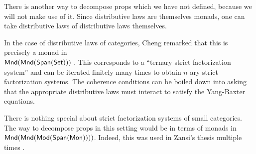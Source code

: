 \begin{aside}
There is another way to decompose props which we have not defined, because we will not make use of it.    Since distributive laws are themselves monads, one can take distributive laws of distributive laws themselves. 


In the case of distributive laws of categories, Cheng remarked that this is precisely a monad in\\ ${\sf Mnd}({\sf Mnd}(\mathsf{Span}(\mathsf{Set})))$ \cite{iterdist}.  This corresponds to a ``ternary strict factorization system'' and can be iterated finitely many times to obtain $n$-ary strict factorization systems. The coherence conditions can be boiled down into asking that the appropriate distributive laws must interact to satisfy the Yang-Baxter equations.

There is nothing special about strict factorization systems of small categories.  The way to decompose props in this setting would be in terms of monads in\\ ${\sf Mnd}({\sf Mnd}({\sf Mod}(\mathsf{Span}({\sf Mon}))))$.  Indeed, this was used in Zansi's thesis multiple times \cite[Proposition 3.3., Example 2.34]{ih}.
\end{aside}
%
%
%
%


